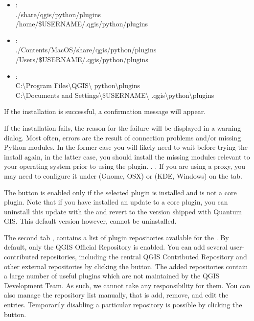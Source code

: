 \begin{itemize}[label=--]
\item {}:\\
./share/qgis/python/plugins \\
/home/\$USERNAME/.qgis/python/plugins
\item {}:\\
./Contents/MacOS/share/qgis/python/plugins \\
/Users/\$USERNAME/.qgis/python/plugins
\item {}:\\
C:\textbackslash Program Files\textbackslash QGIS\textbackslash
python\textbackslash plugins \\
C:\textbackslash Documents and Settings\textbackslash\$USERNAME\textbackslash
.qgis\textbackslash python\textbackslash plugins
\end{itemize}

If the installation is successful, a confirmation message will appear.

If the installation fails, the reason for the failure will be displayed
in a warning dialog. Most often, errors are the result of connection problems
and/or missing Python modules. In the former case you will likely need to
wait before trying the install again, in the latter case, you should install
the missing modules relevant to your operating system prior to using the
plugin. . . If you are using a proxy, you may need to configure it under
 \arrow {} (Gnome, OSX)
or  \arrow {} (KDE, Windows)
on the  tab.

The  button is enabled only if the selected plugin is installed and is not a core plugin. Note that if you have installed an update to a core plugin, you can uninstall this update with the  and revert to the version shipped with Quantum GIS. This default version however, cannot be uninstalled.


The second tab , contains a list of plugin repositories available for the . By default, only the QGIS Official Repository is enabled. You can add several user-contributed repositories, including the central QGIS Contributed Repository and other external repositories by clicking the  button. The added repositories contain a large number of useful plugins which are not maintained by the QGIS Development Team. As such, we cannot take any responsibility for them. You can also manage the repository list manually, that is add, remove, and edit the entries. Temporarily disabling a particular repository is possible by clicking the  button.

